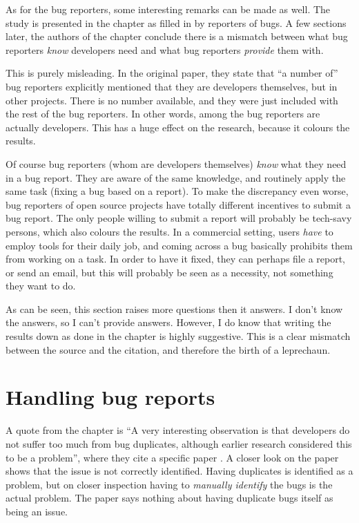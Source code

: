 As for the bug reporters, some interesting remarks can be made as well. 
The study is presented in the chapter as filled in by reporters of bugs. 
A few sections later, the authors of the chapter conclude there is a mismatch between what bug reporters \emph{know} developers need and what bug reporters \emph{provide} them with. 

This is purely misleading.
In the original paper, they state that ``a number of'' bug reporters explicitly mentioned that they are developers themselves, but in other projects. 
There is no number available, and they were just included with the rest of the bug reporters. 
In other words, among the bug reporters are actually developers. 
This has a huge effect on the research, because it colours the results. 

Of course bug reporters (whom are developers themselves) \emph{know} what they need in a bug report. 
They are aware of the same knowledge, and routinely apply the same task (fixing a bug based on a report). 
To make the discrepancy even worse, bug reporters of open source projects have totally different incentives to submit a bug report.
The only people willing to submit a report will probably be tech-savy persons, which also colours the results.
In a commercial setting, users \emph{have} to employ tools for their daily job, and coming across a bug basically prohibits them from working on a task. 
In order to have it fixed, they can perhaps file a report, or send an email, but this will probably be seen as a necessity, not something they want to do. 

As can be seen, this section raises more questions then it answers.
I don't know the answers, so I can't provide answers. 
However, I do know that writing the results down as done in the chapter is highly suggestive. 
This is a clear mismatch between the source and the citation, and therefore the birth of a leprechaun.

\section{Handling bug reports}
A quote from the chapter is ``A very interesting observation is that developers do not suffer too much from bug duplicates, although earlier research considered this to be a problem'', where they cite a specific paper \cite{Anvik:2005:COB:1117696.1117704}.
A closer look on the paper shows that the issue is not correctly identified.
Having duplicates is identified as a problem, but on closer inspection having to \emph{manually identify} the bugs is the actual problem. 
The paper says nothing about having duplicate bugs itself as being an issue.

